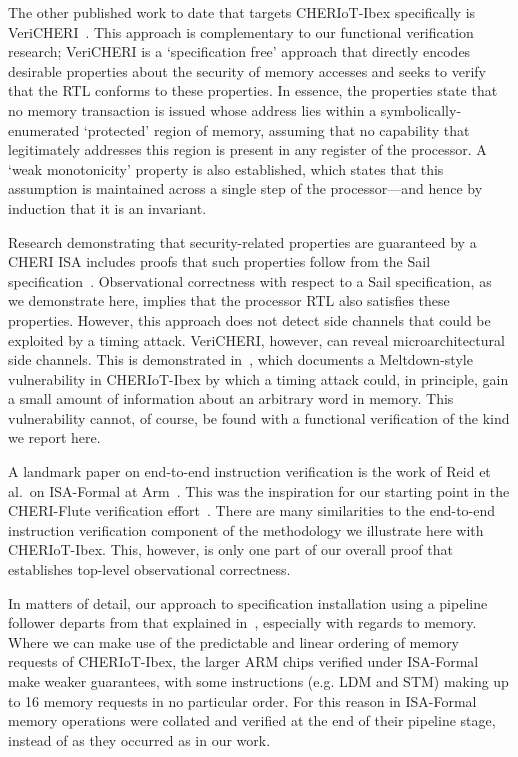 \medskip

The other published work to date that targets CHERIoT-Ibex specifically is
VeriCHERI~\cite{vericheri2024}.  This approach is complementary to our
functional verification research; VeriCHERI is a `specification free'
approach that directly encodes desirable properties about the security of
memory accesses and seeks to verify that the RTL conforms to these
properties. In essence, the properties state that no memory transaction is
issued whose address lies within a symbolically-enumerated `protected'
region of memory, assuming that no capability that legitimately addresses
this region is present in any register of the processor. A `weak
monotonicity' property is also established, which states that this
assumption is maintained across a single step of the processor---and hence
by induction that it is an invariant.

Research demonstrating that security-related properties are guaranteed by a
CHERI ISA includes proofs that such properties follow from the Sail
specification~\cite{cheriot-sail-properties}.  Observational correctness
with respect to a Sail specification, as we demonstrate here, implies that
the processor RTL also satisfies these properties.
However, this approach does not detect side channels that could be
exploited by a timing attack. VeriCHERI, however, can reveal
microarchitectural side channels. This is demonstrated
in~\cite{vericheri2024}, which documents a Meltdown-style vulnerability in
CHERIoT-Ibex by which a timing attack could, in principle, gain a small
amount of information about an arbitrary word in memory. This vulnerability
cannot, of course, be found with a functional verification of the kind we
report here.

\medskip

A landmark paper on end-to-end instruction verification is the work of Reid
et al.~on ISA-Formal at Arm~\cite{Reid-2016-EEV}. This was the inspiration
for our starting point in the CHERI-Flute verification
effort~\cite{Gao:2021:EFV}.  There are many similarities to the
end-to-end instruction verification component of the methodology we
illustrate here with CHERIoT-Ibex.  This, however, is only one part of our
overall proof that establishes top-level observational correctness.

In matters of detail, our approach to specification installation using a
pipeline follower departs from that explained
in~\cite{Reid-2016-EEV}, especially with regards to memory. Where we
can make use of the predictable and linear ordering of memory requests
of CHERIoT-Ibex, the larger ARM chips verified under ISA-Formal make weaker
guarantees, with some instructions (e.g. LDM and STM) making up to 16 memory requests in
no particular order. For this reason in ISA-Formal memory operations were
collated and verified at the end of their pipeline stage, instead of as they
occurred as in our work.

